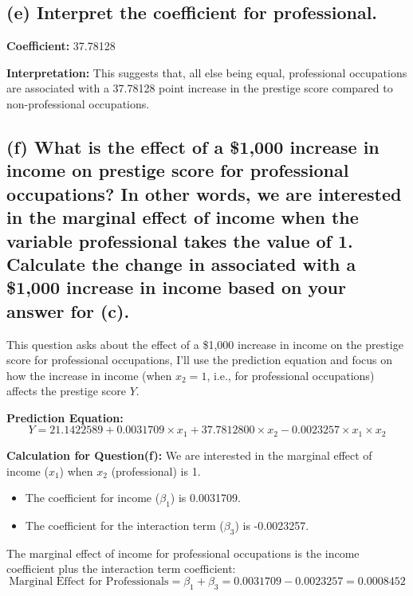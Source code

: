 \documentclass[12pt]{article}
\begin{document}
\subsection{(e) Interpret the coefficient for professional.}

\textbf{Coefficient:} 37.78128

\textbf{Interpretation:} This suggests that, all else being equal, professional occupations are associated with a 37.78128 point increase in the prestige score compared to non-professional occupations.
\subsection{(f) What is the effect of a \$1,000 increase in income on prestige score for professional occupations? In other words, we are interested in the marginal effect of income when the variable professional takes the value of 1. Calculate the change in  associated with a \$1,000 increase in income based on your answer for (c).}

This question asks about the effect of a \$1,000 increase in income on the prestige score for professional occupations, I'll use the prediction equation and focus on how the increase in income (when \( x_2 = 1 \), i.e., for professional occupations) affects the prestige score \( Y \).

\textbf{Prediction Equation:}
\begin{equation}
    Y = 21.1422589 + 0.0031709 \times x_1 + 37.7812800 \times x_2 - 0.0023257 \times x_1 \times x_2
\end{equation}

\textbf{Calculation for Question(f):}
We are interested in the marginal effect of income (\( x_1 \)) when \( x_2 \) (professional) is 1.

\begin{itemize}
    \item The coefficient for income (\( \beta_1 \)) is 0.0031709.
    \item The coefficient for the interaction term (\( \beta_3 \)) is -0.0023257.
\end{itemize}

The marginal effect of income for professional occupations is the income coefficient plus the interaction term coefficient:
\begin{equation}
    \text{Marginal Effect for Professionals} = \beta_1 + \beta_3 = 0.0031709 - 0.0023257 = 0.0008452
\end{equation}
\end{document}

